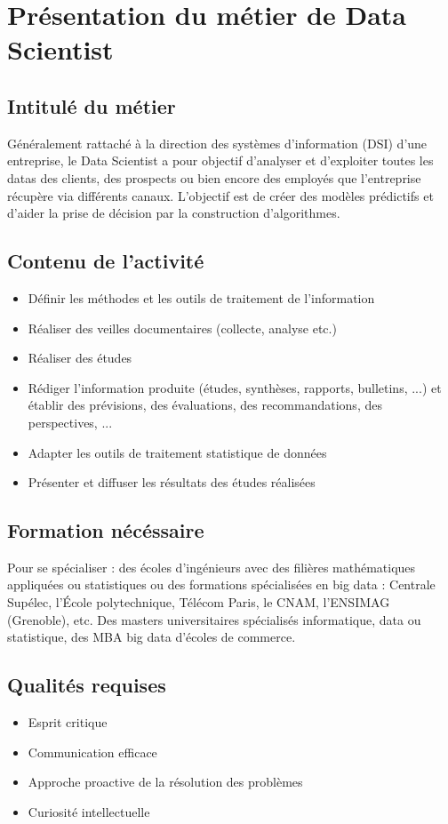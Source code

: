 \chapter{Présentation du métier de Data Scientist}

\section{Intitulé du métier}

Généralement rattaché à la direction des systèmes d'information (DSI) d’une entreprise, le Data Scientist a pour objectif d’analyser et d’exploiter toutes les datas des clients, des prospects ou bien encore des employés que l’entreprise récupère via différents canaux. L’objectif est de créer des modèles prédictifs et d’aider la prise de décision par la construction d'algorithmes.

\section{Contenu de l'activité  }
\begin{itemize}
\item Définir les méthodes et les outils de traitement de l'information
\item Réaliser des veilles documentaires (collecte, analyse etc.)
\item Réaliser des études
\item Rédiger l'information produite (études, synthèses, rapports, bulletins, ...) et établir des prévisions, des évaluations, des recommandations, des perspectives, ...
\item Adapter les outils de traitement statistique de données
\item Présenter et diffuser les résultats des études réalisées
\end{itemize}

\section{Formation nécéssaire}
Pour se spécialiser : des écoles d’ingénieurs avec des filières mathématiques appliquées ou statistiques ou des formations spécialisées en big data : Centrale Supélec, l'École polytechnique, Télécom Paris, le CNAM, l'ENSIMAG (Grenoble), etc. Des masters universitaires spécialisés informatique, data ou statistique, des MBA big data d’écoles de commerce.

\section{Qualités requises}
\begin{itemize}
\item Esprit critique
\item Communication efficace
\item Approche proactive de la résolution des problèmes
\item Curiosité intellectuelle
\end{itemize}

